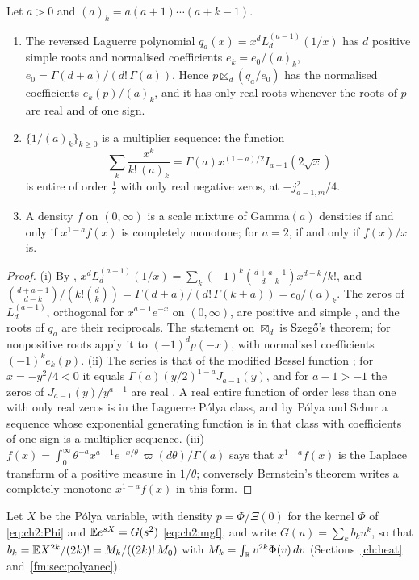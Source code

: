 \begin{lemma}\label{lem:wigfree:laguerre}
Let $a>0$ and $(a)_k=a(a+1)\cdots(a+k-1)$.
\begin{enumerate}
\item[(i)] The reversed Laguerre polynomial $q_a(x)=x^dL_d^{(a-1)}(1/x)$ has $d$ positive simple roots and normalised coefficients $e_k=e_0/(a)_k$, $e_0=\Gamma(d+a)/(d!\,\Gamma(a))$. Hence $p\boxtimes_d(q_a/e_0)$ has the normalised coefficients $e_k(p)/(a)_k$, and it has only real roots whenever the roots of $p$ are real and of one sign.
\item[(ii)] $\{1/(a)_k\}_{k\ge0}$ is a multiplier sequence: the function
\[
\sum_k\frac{x^k}{k!\,(a)_k}=\Gamma(a)x^{(1-a)/2}I_{a-1}(2\sqrt x)
\]
is entire of order $\frac12$ with only real negative zeros, at $-j_{a-1,m}^2/4$.
\item[(iii)] A density $f$ on $(0,\infty)$ is a scale mixture of Gamma$(a)$ densities if and only if $x^{1-a}f(x)$ is completely monotone; for $a=2$, if and only if $f(x)/x$ is.
\end{enumerate}
\end{lemma}

\begin{proof}
(i) By \cite[(18.5.12)]{DLMF}, $x^dL_d^{(a-1)}(1/x)=\sum_k(-1)^k\binom{d+a-1}{d-k}x^{d-k}/k!$, and $\binom{d+a-1}{d-k}/(k!\binom dk)=\Gamma(d+a)/(d!\,\Gamma(k+a))=e_0/(a)_k$. The zeros of $L_d^{(a-1)}$, orthogonal for $x^{a-1}e^{-x}$ on $(0,\infty)$, are positive and simple \cite[Section 18.2(vi)]{DLMF}, and the roots of $q_a$ are their reciprocals. The statement on $\boxtimes_d$ is Szeg\H{o}'s theorem; for nonpositive roots apply it to $(-1)^dp(-x)$, with normalised coefficients $(-1)^ke_k(p)$. (ii) The series is that of the modified Bessel function \cite[(10.25.2)]{DLMF}; for $x=-y^2/4<0$ it equals $\Gamma(a)(y/2)^{1-a}J_{a-1}(y)$, and for $a-1>-1$ the zeros of $J_{a-1}(y)/y^{a-1}$ are real \cite[Section 10.21(i)]{DLMF}. A real entire function of order less than one with only real zeros is in the Laguerre P\'olya class, and by P\'olya and Schur \cite{PS14} a sequence whose exponential generating function is in that class with coefficients of one sign is a multiplier sequence. (iii) $f(x)=\int_0^\infty\theta^{-a}x^{a-1}e^{-x/\theta}\,\varpi(d\theta)/\Gamma(a)$ says that $x^{1-a}f(x)$ is the Laplace transform of a positive measure in $1/\theta$; conversely Bernstein's theorem writes a completely monotone $x^{1-a}f(x)$ in this form.
\end{proof}

Let $X$ be the P\'olya variable, with density $p=\Phi/\Xi(0)$ for the kernel $\Phi$ of \eqref{eq:ch2:Phi} and $\mathbb{E} e^{sX}=G(s^2)$ \eqref{eq:ch2:mgf}, and write $G(u)=\sum_kb_ku^k$, so that $b_k=\mathbb{E} X^{2k}/(2k)!=M_k/((2k)!\,M_0)$ with $M_k=\int_{\mathbb{R}} v^{2k}\Phi(v)\,dv$ (Sections~\ref{ch:heat} and~\ref{fm:sec:polyanec}).

